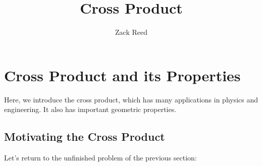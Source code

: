 \documentclass{ximera}
\author{Zack Reed}
\title{Cross Product}
\begin{document}
\begin{abstract}

\end{abstract}
\maketitle

\section*{Cross Product and its Properties}

 Here, we introduce the cross product, which has many applications in physics and engineering.  It also has important geometric properties.
 
\subsection*{Motivating the Cross Product}

Let's return to the unfinished problem of the previous section:
\end{document}
